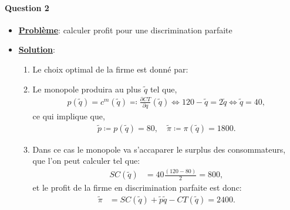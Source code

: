  \begin{frame}
  [allowframebreaks]{\insertsection}
  \framesubtitle{Question 2\\}
  \begin{itemize}
    \item \textbf{\underline{Problème}}: calculer  profit pour une discrimination parfaite
    \item \textbf{\underline{Solution}}: 
    \begin{enumerate}[$\cdot$]
      \item Le choix optimal de la firme est donné par:
      \item Le monopole produira  au plus $\tilde{q}$ tel que,
      \begin{align*}
        p(\tilde{q}) = c^m(\tilde{q}) \eqqcolon \frac{\partial CT}{\partial q}(\tilde{q}) 
        \Leftrightarrow  120 - \tilde{q} = 2\tilde{q}  \Leftrightarrow \tilde{q} = 40,
      \end{align*}
      ce qui implique que,
      \begin{align*}
        \tilde{p} \coloneqq p(\tilde{q}) = 80, \quad \tilde{\pi} \coloneqq \pi(\tilde{q}) = 1800.
        \end{align*}
      \item Dans ce cas le monopole va s’accaparer le surplus des consommateurs, que l’on peut calculer tel que:
       \begin{align*}
        SC(\tilde{q}) &= 40\frac{(120 - 80)}{2} = 800,
       \end{align*}
       et le profit de la firme en discrimination parfaite est donc:
       \begin{align*}
        \tilde{\pi} &= SC(\tilde{q}) + \tilde{p}\tilde{q} - CT(\tilde{q}) = 2400.
       \end{align*}

    \end{enumerate}
  \end{itemize}

\end{frame}

